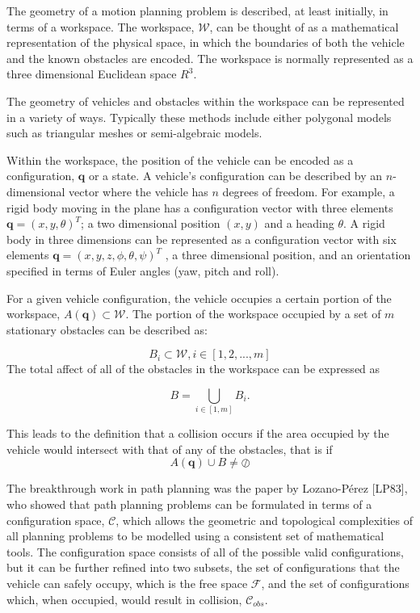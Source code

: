 The geometry of a motion planning problem is described, at least initially, in terms of a
workspace. The workspace, $\mathcal{W}$, can be thought of as a mathematical representation of the
physical space, in which the boundaries of both the vehicle and the known obstacles are encoded. 
The workspace is normally represented as a three dimensional Euclidean space $R^3$.

The geometry of vehicles and obstacles within the workspace can be represented in a variety of ways. 
Typically these methods include either polygonal models such as triangular meshes or semi-algebraic models.


Within the workspace, the position of the vehicle can be encoded as a configuration, $\mathbf{q}$ or a state. A
vehicle’s configuration can be described by an $n$-dimensional vector where the vehicle has $n$
degrees of freedom. For example, a rigid body moving in the plane has a configuration vector
with three elements $\mathbf{q} = (x, y, \theta)^T$;  a two dimensional position $(x,y)$ and a heading $\theta$.
A rigid body in three dimensions can be represented as a configuration vector with six elements $\mathbf{q} = (x, y, z, \phi, \theta, \psi)^T$ , a
three dimensional position, and an orientation specified in terms of Euler angles (yaw, pitch and roll).

For a given vehicle configuration, the vehicle occupies a certain portion of the workspace,
$A(\mathbf{q}) \subset \mathcal{W}$. The portion of the workspace occupied by a set of $m$ stationary obstacles can
be described as:

\begin{equation}
B_i \subset \mathcal{W}, i \in [1, 2, ..., m]
\end{equation}
The total affect of all of the obstacles in the workspace can be expressed as 

\begin{equation}
B = \bigcup_{i \in [1,m]} B_i. 
\end{equation}

This leads to the definition that a collision occurs if the area occupied by the vehicle would intersect with that of any of the obstacles, that
is if 
\begin{equation}
A(\mathbf{q}) \cup B \neq \oslash
\end{equation}


The breakthrough work in path planning was the paper by Lozano-Pérez [LP83], who
showed that path planning problems can be formulated in terms of a configuration space,
$\mathcal{C}$, which allows the geometric and topological complexities of all planning problems to be
modelled using a consistent set of mathematical tools. The configuration space consists of all
of the possible valid configurations, but it can be further refined into two subsets, the set of
configurations that the vehicle can safely occupy, which is the free space $\mathcal{F}$, and the set of
configurations which, when occupied, would result in collision, $\mathcal{C}_{obs}$.


